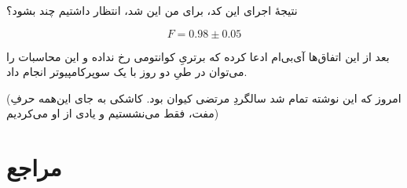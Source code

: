 \documentclass[11pt]{article}
\begin{document}
نتیجهٔ اجرای این کد، برای من این شد، انتظار داشتیم چند بشود؟

\[ F =  0.98 \pm 0.05 \]

بعد از این اتفاق‌ها آی‌بی‌ام ادعا کرده که برتریِ کوانتومی رخ نداده و این محاسبات را می‌توان در طیِ دو روز با یک سوپرکامپیوتر انجام داد. \cite{ibm}

(امروز که این نوشته تمام شد سالگردِ مرتضی کیوان بود. کاشکی به جای این‌همه حرفِ مفت، فقط می‌نشستیم و یادی از او می‌کردیم)

\section*{مراجع}
\begin{latin}
\printbibliography[heading=none]
\end{latin}
\end{document}
